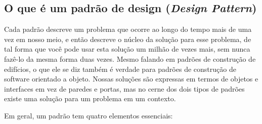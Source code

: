 \subsection{O que é um padrão de design (\emph{Design Pattern})}
\label{sub:introducao}

Cada padrão descreve um problema que ocorre ao longo do tempo
mais de uma vez em nosso meio, e então descreve o núcleo da solução
para esse problema, de tal forma que você pode usar esta solução um milhão de vezes
mais, sem nunca fazê-lo da mesma forma duas vezes. 
Mesmo falando em padrões de construção de edifícios, o que ele se diz também é verdade para padrões de construção de software orientado a objeto. Nossas soluções são expressas em termos de objetos e interfaces em vez de paredes e portas, mas no cerne dos dois tipos de padrões existe uma solução para um problema em um contexto.\cite{gamma95}

Em geral, um padrão tem quatro elementos essenciais:\cite{gamma95}

